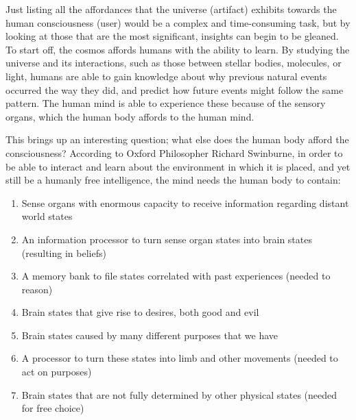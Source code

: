 Just listing all the affordances that the universe (artifact) exhibits
towards the human consciousness (user) would be a complex and
time-consuming task, but by looking at those that are the most
significant, insights can begin to be gleaned. To start off, the cosmos
affords humans with the ability to learn. By studying the universe and
its interactions, such as those between stellar bodies, molecules, or
light, humans are able to gain knowledge about why previous natural
events occurred the way they did, and predict how future events might
follow the same pattern. The human mind is able to experience these
because of the sensory organs, which the human body affords to the
human mind.


This brings up an interesting question; what else does the human body
afford the consciousness? According to Oxford Philosopher Richard
Swinburne\citep[][pg. 169]{swinburne2004}, in order to be able to interact and
learn about the environment in which it is placed, and yet still be a
humanly free intelligence, the mind needs the human body to contain:

\begin{enumerate}
\item Sense organs with enormous capacity to receive information regarding
distant world states
\item An information processor to turn sense organ states into brain states
(resulting in beliefs)
\item A memory bank to file states correlated with past experiences (needed
to reason)
\item Brain states that give rise to desires, both good and evil
\item Brain states caused by many different purposes that we have
\item A processor to turn these states into limb and other movements
(needed to act on purposes)
\item Brain states that are not fully determined by other physical states
(needed for free choice)
\end{enumerate}


